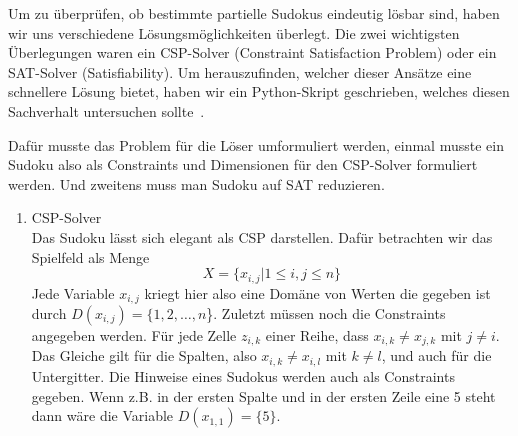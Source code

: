 Um zu überprüfen, ob bestimmte partielle Sudokus eindeutig lösbar sind, haben wir uns verschiedene Lösungsmöglichkeiten überlegt.
Die zwei wichtigsten Überlegungen waren ein CSP-Solver (Constraint Satisfaction Problem) oder ein SAT-Solver (Satisfiability).
Um herauszufinden, welcher dieser Ansätze eine schnellere Lösung bietet, haben wir ein Python-Skript geschrieben, welches diesen Sachverhalt untersuchen sollte~\cite{sat_csp_comparison}.

Dafür musste das Problem für die Löser umformuliert werden, einmal musste ein Sudoku also als Constraints und Dimensionen für den CSP-Solver formuliert werden. 
Und zweitens muss man Sudoku auf SAT reduzieren.

\begin{enumerate}
    \item CSP-Solver \\
    Das Sudoku lässt sich elegant als CSP darstellen. Dafür betrachten wir das Spielfeld als Menge
    $$
        X = \{x_{i,j}|1 \leq i,j \leq n\}
    $$
    Jede Variable $x_{i,j}$ kriegt hier also eine Domäne von Werten die gegeben ist durch $D(x_{i,j}) = \{1, 2, \dots, n$\}. 
    Zuletzt müssen noch die Constraints angegeben werden.
    Für jede Zelle $z_{i, k}$ einer Reihe, dass $x_{i, k} \neq x_{j, k}$ mit $j \neq i$.
    Das Gleiche gilt für die Spalten, also $x_{i, k} \neq x_{i, l}$ mit $k \neq l$, und auch für die Untergitter.
    Die Hinweise eines Sudokus werden auch als Constraints gegeben. Wenn z.B. in der ersten Spalte und in der ersten Zeile eine 5 steht dann wäre die Variable $D(x_{1, 1}) = \{5\}$.
    


\end{enumerate}
